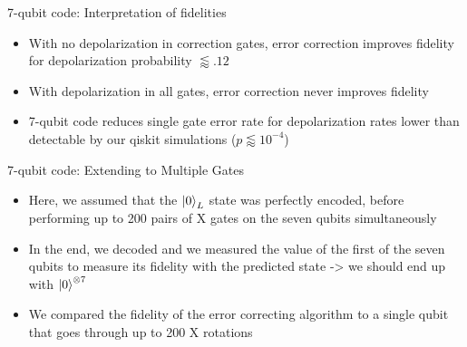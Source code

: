 \documentclass{beamer}
\begin{document}
\begin{frame}{7-qubit code: Interpretation of fidelities}
  \begin{itemize}
  \item With no depolarization in correction gates, error correction improves fidelity for depolarization probability $\lessapprox .12$
  \item With depolarization in all gates, error correction never improves fidelity
    \pause
  \item 7-qubit code reduces single gate error rate for depolarization rates lower than detectable by our qiskit simulations ($p\lessapprox 10^{-4}$)
  \end{itemize}
\end{frame}

\begin{frame}{7-qubit code: Extending to Multiple Gates}
    \begin{itemize}
        \item <1-> Here, we assumed that the $\left\vert{0}\right\rangle_L$ state was perfectly encoded, before performing up to 200 pairs of X gates on the seven qubits simultaneously
        \item <2-> In the end, we decoded and we measured the value of the first of the seven qubits to measure its fidelity with the predicted state -> we should end up with $\left\vert{0}\right\rangle^{\otimes 7}$
        \item <3-> We compared the fidelity of the error correcting algorithm to a single qubit that goes through up to 200 X rotations
    \end{itemize}
\end{frame}
\end{document}
